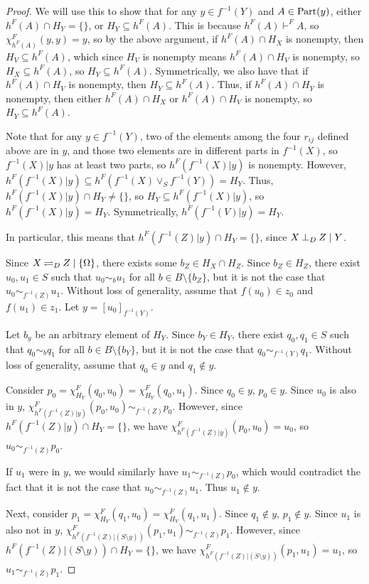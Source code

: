 \documentclass[authordate,onecolumn]{miri-tech-article}
\begin{document}
\begin{proof}
We will use this to show that for any $y\in f^{-1}(Y)$ and $A\in \parts[y]$, either $h^F(A)\cap H_Y=\{\}$, or $H_Y\subseteq h^F(A)$. This is because $h^F(A)\vdash^F A$, so $\chi^F_{h^F(A)}(y,y)=y$, so by the above argument, if $h^F(A)\cap H_X$ is nonempty, then $H_V\subseteq h^F(A)$, which since $H_V$ is nonempty means $h^F(A)\cap H_V$ is nonempty, so $H_X\subseteq h^F(A)$, so $H_Y\subseteq h^F(A)$. Symmetrically, we also have that if $h^F(A)\cap H_V$ is nonempty, then $H_Y\subseteq h^F(A)$. Thus, if $h^F(A)\cap H_Y$ is nonempty, then either $h^F(A)\cap H_X$ or $h^F(A)\cap H_V$ is nonempty, so $H_Y\subseteq h^F(A)$.


Note that for any $y\in f^{-1}(Y)$, two of the elements among the four $r_{ij}$ defined above are in $y$, and those two elements are in different parts in $f^{-1}(X)$, so $f^{-1}(X)|y$ has at least two parts, so $h^F(f^{-1}(X)|y)$ is nonempty. However, $h^F(f^{-1}(X)|y)\subseteq h^F(f^{-1}(X)\vee_S f^{-1}(Y))=H_Y$. Thus, $h^F(f^{-1}(X)|y)\cap H_Y\neq\{\}$, so $H_Y\subseteq h^F(f^{-1}(X)|y)$, so $h^F(f^{-1}(X)|y)=H_Y$. Symmetrically, $h^F(f^{-1}(V)|y)=H_Y$.

In particular, this means that $h^F(f^{-1}(Z)|y)\cap H_Y=\{\}$, since $\cod{X}{Z}{Y}$. 

Since $\ncod{X}{Z}{\{\Omega\}}$, there exists some $b_Z\in H_X\cap H_Z$. Since $b_Z\in H_Z$, there exist $u_0,u_1\in S$ such that $u_0\sim_b u_1$ for all $b\in B\setminus \{b_Z\}$, but it is not the case that $u_0\sim_{f^{-1}(Z)} u_1$. Without loss of generality, assume that $f(u_0)\in z_0$ and $f(u_1)\in z_1$. Let $y=[u_0]_{f^{-1}(Y)}$.

Let $b_y$ be an arbitrary element of $H_Y$. Since $b_Y\in H_Y$, there exist $q_0,q_1\in S$ such that $q_0\sim_b q_1$ for all $b\in B\setminus \{b_Y\}$, but it is not the case that $q_0\sim_{f^{-1}(Y)} q_1$. Without loss of generality, assume that $q_0\in y$ and $q_1\notin y$.

Consider $p_0=\chi^F_{H_Y}(q_0,u_0)=\chi^F_{H_Y}(q_0,u_1)$. Since $q_0\in y$, $p_0\in y$. Since $u_0$ is also in $y$,  $\chi^F_{h^F(f^{-1}(Z)|y)}(p_0,u_0)\sim_{f^{-1}(Z)}p_0$. However, since $h^F(f^{-1}(Z)|y)\cap H_Y=\{\}$, we have $\chi^F_{h^F(f^{-1}(Z)|y)}(p_0,u_0)=u_0$, so $u_0\sim_{f^{-1}(Z)}p_0$.

If $u_1$ were in $y$, we would similarly have $u_1\sim_{f^{-1}(Z)}p_0$, which would contradict the fact that it is not the case that $u_0\sim_{f^{-1}(Z)} u_1$. Thus $u_1\notin y$.

Next, consider $p_1=\chi^F_{H_Y}(q_1,u_0)=\chi^F_{H_Y}(q_1,u_1)$. Since $q_1\notin y$, $p_1\notin y$. Since $u_1$ is also not in $y$,  $\chi^F_{h^F(f^{-1}(Z)|(S\setminus y))}(p_1,u_1)\sim_{f^{-1}(Z)}p_1$. However, since $h^F(f^{-1}(Z)|(S\setminus y))\cap H_Y=\{\}$, we have $\chi^F_{h^F(f^{-1}(Z)|(S\setminus y))}(p_1,u_1)=u_1$, so $u_1\sim_{f^{-1}(Z)}p_1$. 


\end{proof}
\end{document}
